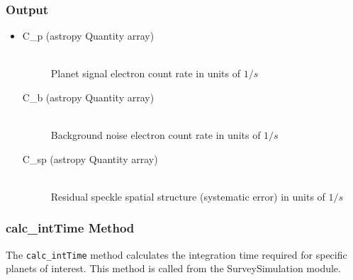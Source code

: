 \documentclass[cleanfoot]{asme2ej}
\begin{document}
\subsubsection*{Output}
\begin{itemize}
\item 
\begin{description}
    \item[C\_p (astropy Quantity array)] \hfill \\ Planet signal electron count rate in units of $ 1/s $
    \item[C\_b (astropy Quantity array)] \hfill \\ Background noise electron count rate in units of $ 1/s $
    \item[C\_sp (astropy Quantity array)] \hfill \\ Residual speckle spatial structure (systematic error) in units of $ 1/s $
\end{description}
\end{itemize}

\subsubsection{calc\_intTime Method} \label{sec:calcintTimetask}
The \verb+calc_intTime+ method calculates the integration time required for specific planets of interest.  This method is called from the SurveySimulation module.
\end{document}
